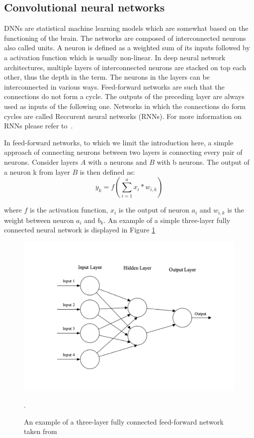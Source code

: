 \subsection{Convolutional neural networks}\label{subsec:convolutional-neural-networks}
DNNs are statistical machine learning models which are somewhat based on the functioning of the brain.
The networks are composed of interconnected neurons also called units.
A neuron is defined as a weighted sum of its inputs followed by a activation function which is usually non-linear.
In deep neural network architectures, multiple layers of interconnected neurons are stacked on top each other, thus the depth in the term.
The neurons in the layers can be interconnected in various ways.
Feed-forward networks are such that the connections do not form a cycle.
The outputs of the preceding layer are always used as inputs of the following one. 
Networks in which the connections do form cycles are called Reccurent neural networks (RNNs). 
For more information on RNNs please refer to~\cite{reccurent-neural-networks}.

In feed-forward networks, to which we limit the introduction here, a simple approach of connecting neurons between two layers is connecting every pair of neurons. 
Consider layers $A$ with a neurons and $B$ with b neurons.
The output of a neuron k from layer $B$ is then defined as:
\begin{equation}
    y_k=f(\sum_{i=1}^{a}x_i*w_{i,k})
\end{equation}

where $f$ is the activation function, $x_i$ is the output of neuron $a_i$ and $w_{i, k}$ is the weight between neuron $a_i$ and $b_k$. An example of a simple three-layer fully connected neural network is displayed in Figure \ref{fig:simple-net}
\begin{figure}[!htpb]
\centering
   \includegraphics[width=0.8\linewidth]{img/ch2/simple-net}
   \caption[Feed-forward network example]{An example of a three-layer fully connected feed-forward network taken from~\cite{conv-intro}}.
    \label{fig:simple-net}
\end{figure}

